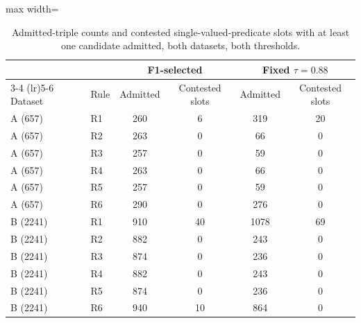 \documentclass[11pt]{article}
\begin{document}
\begin{table}[htbp]
\centering
\caption{Admitted-triple counts and contested single-valued-predicate
slots with at least one candidate admitted, both datasets, both
thresholds.}
\label{tab:dec026-admitted}
\begin{adjustbox}{max width=\textwidth}
\begin{tabular}{@{}llcc cc@{}}
\toprule
& & \multicolumn{2}{c}{F1-selected} & \multicolumn{2}{c}{Fixed $\tau=0.88$} \\
\cmidrule(lr){3-4} \cmidrule(lr){5-6}
Dataset & Rule & Admitted & Contested slots & Admitted & Contested slots \\
\midrule
A (657) & R1 & 260 & 6 & 319 & 20 \\
A (657) & R2 & 263 & 0 & 66 & 0 \\
A (657) & R3 & 257 & 0 & 59 & 0 \\
A (657) & R4 & 263 & 0 & 66 & 0 \\
A (657) & R5 & 257 & 0 & 59 & 0 \\
A (657) & R6 & 290 & 0 & 276 & 0 \\
\midrule
B (2241) & R1 & 910 & 40 & 1078 & 69 \\
B (2241) & R2 & 882 & 0 & 243 & 0 \\
B (2241) & R3 & 874 & 0 & 236 & 0 \\
B (2241) & R4 & 882 & 0 & 243 & 0 \\
B (2241) & R5 & 874 & 0 & 236 & 0 \\
B (2241) & R6 & 940 & 10 & 864 & 0 \\
\bottomrule
\end{tabular}
\end{adjustbox}
\end{table}
\end{document}
